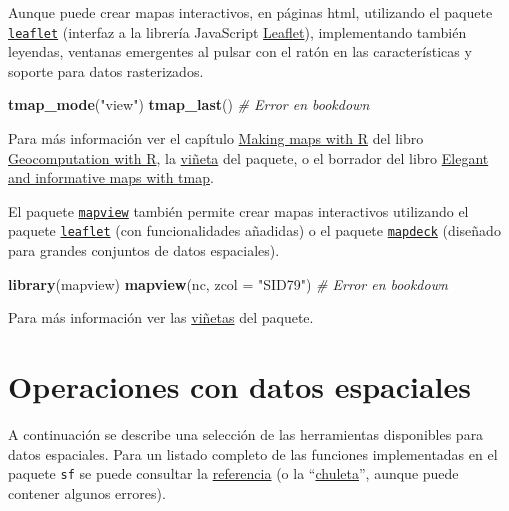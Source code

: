 \documentclass[
]{book}
\newenvironment{Shaded}{\begin{snugshade}}{\end{snugshade}}
\newcommand{\AttributeTok}[1]{\textcolor[rgb]{0.13,0.29,0.53}{#1}}
\newcommand{\CommentTok}[1]{\textcolor[rgb]{0.56,0.35,0.01}{\textit{#1}}}
\newcommand{\FunctionTok}[1]{\textcolor[rgb]{0.13,0.29,0.53}{\textbf{#1}}}
\newcommand{\NormalTok}[1]{#1}
\newcommand{\StringTok}[1]{\textcolor[rgb]{0.31,0.60,0.02}{#1}}
\theoremstyle{break}
\theoremstyle{definition}
\theoremstyle{definition}
\theoremstyle{definition}
\theoremstyle{definition}
\theoremstyle{remark}
\begin{document}
Aunque puede crear mapas interactivos, en páginas html, utilizando el paquete \href{https://rstudio.github.io/leaflet}{\texttt{leaflet}} (interfaz a la librería JavaScript \href{https://leafletjs.com}{Leaflet}), implementando también leyendas, ventanas emergentes al pulsar con el ratón en las características y soporte para datos rasterizados.

\begin{Shaded}
\begin{Highlighting}[]
\FunctionTok{tmap\_mode}\NormalTok{(}\StringTok{"view"}\NormalTok{)}
\FunctionTok{tmap\_last}\NormalTok{()}
\CommentTok{\# Error en bookdown}
\end{Highlighting}
\end{Shaded}

Para más información ver el capítulo \href{https://geocompr.robinlovelace.net/adv-map.html\#adv-map}{Making maps with R} del libro \href{https://geocompr.robinlovelace.net}{Geocomputation with R}, la \href{https://r-tmap.github.io/tmap/articles/tmap-getstarted.html}{viñeta} del paquete, o el borrador del libro \href{https://r-tmap.github.io}{Elegant and informative maps with tmap}.

El paquete \href{https://r-spatial.github.io/mapview}{\texttt{mapview}} también permite crear mapas interactivos utilizando el paquete \href{https://rstudio.github.io/leaflet}{\texttt{leaflet}} (con funcionalidades añadidas) o el paquete \href{https://symbolixau.github.io/mapdeck}{\texttt{mapdeck}} (diseñado para grandes conjuntos de datos espaciales).

\begin{Shaded}
\begin{Highlighting}[]
\FunctionTok{library}\NormalTok{(mapview)}
\FunctionTok{mapview}\NormalTok{(nc, }\AttributeTok{zcol =} \StringTok{"SID79"}\NormalTok{)}
\CommentTok{\# Error en bookdown}
\end{Highlighting}
\end{Shaded}

Para más información ver las \href{https://r-spatial.github.io/mapview/articles/articles/mapview_01-basics.html}{viñetas} del paquete.

\section{Operaciones con datos espaciales}\label{operaciones-datos}

A continuación se describe una selección de las herramientas disponibles para datos espaciales.
Para un listado completo de las funciones implementadas en el paquete \texttt{sf} se puede consultar la \href{https://r-spatial.github.io/sf/reference/index.html}{referencia} (o la ``\href{https://github.com/rstudio/cheatsheets/blob/master/sf.pdf}{chuleta}'', aunque puede contener algunos errores).
\end{document}
